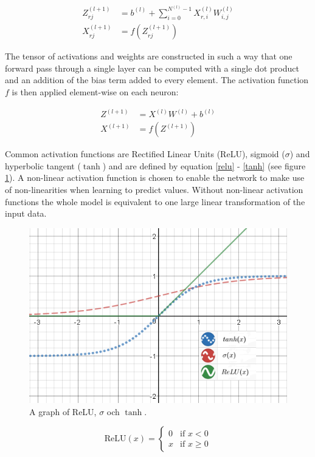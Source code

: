 \documentclass[a4paper, twoside]{article}
\begin{document}
\begin{align}
Z_{rj}^{(l+1)} & = b^{(l)} + \sum^{N^{(l)}-1}_{i = 0} X^{(l)}_{r,i} W^{(l)}_{i,j}\\
X_{rj}^{(l+1)} & = f(Z_{rj}^{(l+1)})
\end{align}

The tensor of activations and weights are constructed in such a way that one forward pass through a single layer can be computed with a single dot product and an addition of the bias term added to every element. The activation function $f$ is then applied element-wise on each neuron: \cite{cs231n} \cite{wikiStanford}

\begin{align}
Z^{(l+1)} & = X^{(l)}W^{(l)}+b^{(l)}\\
X^{(l+1)} & = f(Z^{(l+1)})
\end{align}

Common activation functions are Rectified Linear Units (ReLU), sigmoid ($\sigma$) and hyperbolic tangent ($\tanh$) and are defined by equation \eqref{relu} - \eqref{tanh} (see figure \ref{activation_function}). A non-linear activation function is chosen to enable the network to make use of non-linearities when learning to predict values. Without non-linear activation functions the whole model is equivalent to one large linear transformation of the input data. \cite{cs231n}
\\
\begin{figure}[h]
	\centering
  		\includegraphics[scale=0.73]{activationfunction.png}
  	\caption{A graph of ReLU, $\sigma$ och $\tanh$.} \label{activation_function}
\end{figure}

\begin{equation}\label{relu}
\mbox{ReLU}{(x)} = \begin{cases} 
			0 & \mbox{if } x < 0 \\ 
			x & \mbox{if } x \geq 0 
		\end{cases}
\end{equation}
\end{document}
